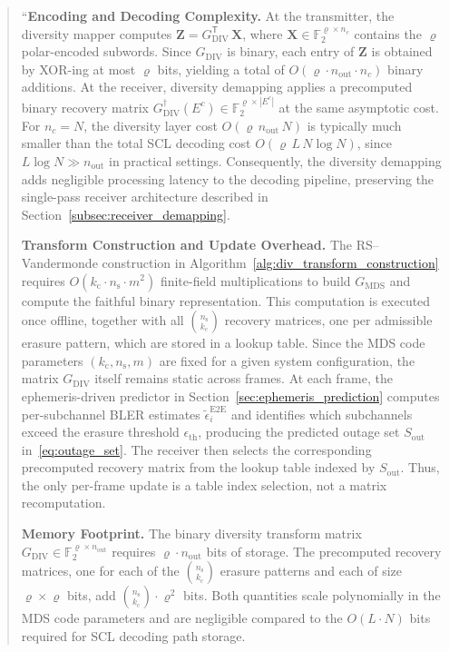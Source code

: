 \begin{quote}
``{\color{blue}\textbf{Encoding and Decoding Complexity.}
At the transmitter, the diversity mapper computes
$\mathbf{Z} = G_{\mathrm{DIV}}^{\mathsf{T}}\,\mathbf{X}$, where
$\mathbf{X} \in \mathbb{F}_2^{\varrho \times n_c}$ contains the
$\varrho$ polar-encoded subwords. Since $G_{\mathrm{DIV}}$ is binary,
each entry of $\mathbf{Z}$ is obtained by XOR-ing at most $\varrho$
bits, yielding a total of
$O(\varrho \cdot n_{\mathrm{out}} \cdot n_c)$ binary additions.
At the receiver, diversity demapping applies a precomputed binary
recovery matrix
$G_{\mathrm{DIV}}^{\dagger}(E^c) \in
\mathbb{F}_2^{\varrho \times |E^c|}$
at the same asymptotic cost. For $n_c = N$, the diversity layer cost
$O(\varrho\, n_{\mathrm{out}}\, N)$ is typically much smaller than
the total SCL decoding cost $O(\varrho\, L\, N \log N)$, since
$L \log N \gg n_{\mathrm{out}}$ in practical settings. Consequently, the diversity demapping adds negligible
processing latency to the decoding pipeline, preserving the
single-pass receiver architecture described in
Section~\ref{subsec:receiver_demapping}.}

{\color{blue}\textbf{Transform Construction and Update Overhead.}
The RS--Vandermonde construction in
Algorithm~\ref{alg:div_transform_construction} requires
$O(k_{\mathrm{c}} \cdot n_{\mathrm{s}} \cdot m^2)$ finite-field
multiplications to build $G_{\mathrm{MDS}}$ and compute the faithful
binary representation. This computation is executed once offline,
together with all $\binom{n_{\mathrm{s}}}{k_{\mathrm{c}}}$ recovery
matrices, one per admissible erasure pattern, which are stored in a
lookup table.
Since the MDS code parameters $(k_{\mathrm{c}}, n_{\mathrm{s}}, m)$
are fixed for a given system configuration, the matrix
$G_{\mathrm{DIV}}$ itself remains static across frames.
At each frame, the ephemeris-driven predictor in
Section~\ref{sec:ephemeris_prediction} computes per-subchannel
BLER estimates $\tilde{\epsilon}_{i}^{\mathrm{E2E}}$ and
identifies which subchannels exceed the erasure threshold
$\epsilon_{\mathrm{th}}$, producing the predicted outage set
$S_{\mathrm{out}}$ in~\eqref{eq:outage_set}. The receiver then
selects the corresponding precomputed recovery matrix from the
lookup table indexed by $S_{\mathrm{out}}$. Thus, the only
per-frame update is a table index selection, not a matrix
recomputation.}

{\color{blue}\textbf{Memory Footprint.}
The binary diversity transform matrix
$G_{\mathrm{DIV}} \in \mathbb{F}_2^{\varrho \times n_{\mathrm{out}}}$
requires $\varrho \cdot n_{\mathrm{out}}$ bits of storage.
The precomputed recovery matrices, one for each of the
$\binom{n_{\mathrm{s}}}{k_{\mathrm{c}}}$ erasure patterns and
each of size $\varrho \times \varrho$ bits, add
$\binom{n_{\mathrm{s}}}{k_{\mathrm{c}}} \cdot \varrho^2$ bits.
Both quantities scale polynomially in the MDS code parameters and
are negligible compared to the $O(L \cdot N)$ bits required for
SCL decoding path storage.}


\end{quote}
